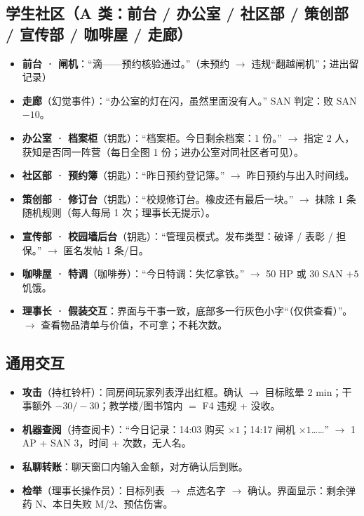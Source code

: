 \documentclass[UTF8, fontset=none, 11pt]{ctexart}
\begin{document}
\subsection{学生社区（A 类：前台 / 办公室 / 社区部 / 策创部 / 宣传部 / 咖啡屋 / 走廊）}
\begin{itemize}
  \item \textbf{前台 · 闸机}：``滴——预约核验通过。''（未预约 $\to$ 违规``翻越闸机''；进出留记录）
  \item \textbf{走廊}（幻觉事件）：``办公室的灯在闪，虽然里面没有人。'' SAN 判定：败 SAN $-10$。
  \item \textbf{办公室 · 档案柜}（钥匙）：``档案柜。今日剩余档案：1 份。'' $\to$ 指定 2 人，获知是否同一阵营（每日全图 1 份；进办公室对同社区者可见）。
  \item \textbf{社区部 · 预约簿}（钥匙）：``昨日预约登记簿。'' $\to$ 昨日预约与出入时间线。
  \item \textbf{策创部 · 修订台}（钥匙）：``校规修订台。橡皮还有最后一块。'' $\to$ 抹除 1 条随机规则（每人每局 1 次；理事长无提示）。
  \item \textbf{宣传部 · 校园墙后台}（钥匙）：``管理员模式。发布类型：破译 / 表彰 / 担保。'' $\to$ 匿名发帖 1 条/日。
  \item \textbf{咖啡屋 · 特调}（咖啡券）：``今日特调：失忆拿铁。'' $\to$ 50 HP 或 30 SAN $+5$ 饥饿。
  \item \textbf{理事长 · 假装交互}：界面与干事一致，底部多一行灰色小字``（仅供查看）''。$\to$ 查看物品清单与价值，不可拿；不耗次数。
\end{itemize}

\subsection{通用交互}
\begin{itemize}
  \item \textbf{攻击}（持杠铃杆）：同房间玩家列表浮出红框。确认 $\to$ 目标眩晕 2 min；干事额外 $-30/-30$；教学楼/图书馆内 $=$ F4 违规 + 没收。
  \item \textbf{机器查阅}（持查阅卡）：``今日记录：14:03 购买 $\times 1$；14:17 闸机 $\times 1$……'' $\to$ 1 AP + SAN 3，时间 + 次数，无人名。
  \item \textbf{私聊转账}：聊天窗口内输入金额，对方确认后到账。
  \item \textbf{检举}（理事长操作员）：目标列表 $\to$ 点选名字 $\to$ 确认。界面显示：剩余弹药 N、本日失败 M/2、预估伤害。
\end{itemize}
\end{document}
